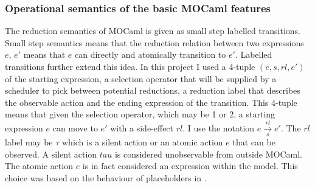 \documentclass[12pt,twoside,notitlepage]{report}
\begin{document}
\subsubsection{Operational semantics of the basic MOCaml features}

The reduction semantics of MOCaml is given as small step labelled transitions. Small step semantics means that the reduction relation between two expressions $ e, \, e' $ means that $ e $ can directly and atomically transition to $ e' $. Labelled transitions further extend this idea. In this project I used a 4-tuple $ (e, s, rl, e') $ of the starting expression, a selection operator that will be supplied by a scheduler to pick between potential reductions, a reduction label that describes the observable action and the ending expression of the transition. This 4-tuple means that given the selection operator, which may be 1 or 2, a starting expression $ e $  can move to $ e' $ with a side-effect $ rl $. I use the notation $ e \overset{rl}{\underset{s}{\longrightarrow}} e' $. The $ rl $ label may be $ \tau $ which is a silent action or an atomic action $ e $ that can be observed. A silent action $tau$ is considered unobservable from outside MOCaml. The atomic action $e$ is in fact considered an expression within the model.  This choice was based on the behaviour of placeholders in .



\end{document}

